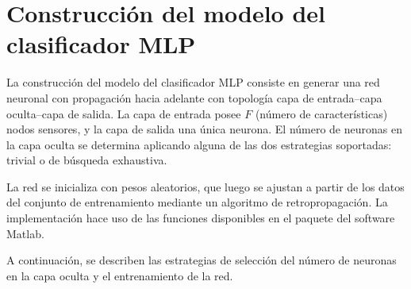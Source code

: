 %
%
%
\section{Construcción del modelo del clasificador MLP}
%
La construcción del modelo del clasificador MLP consiste en generar
una red neuronal con propagación hacia adelante con topología capa de
entrada--capa oculta--capa de salida.
La capa de entrada posee $F$ (número de características) nodos
sensores, y la capa de salida una única neurona.
El número de neuronas en la capa oculta se determina aplicando alguna
de las dos estrategias soportadas: trivial o de búsqueda exhaustiva.

La red se inicializa con pesos aleatorios, que luego se ajustan a
partir de los datos del conjunto de entrenamiento mediante un
algoritmo de retropropagación.
La implementación hace uso de las funciones disponibles en el paquete
 del software Matlab.

A continuación, se describen las estrategias de selección del número de
neuronas en la capa oculta y el entrenamiento de la red.
